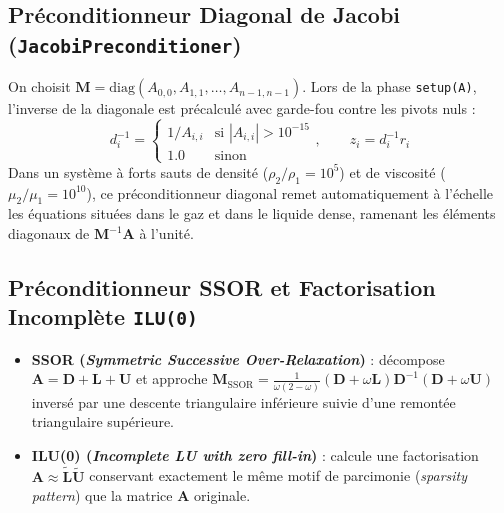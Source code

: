 \documentclass[10pt,a4paper,oneside]{book}
\begin{document}
\subsection{Préconditionneur Diagonal de Jacobi (\texttt{JacobiPreconditioner})}
On choisit $\mathbf{M} = \text{diag}(A_{0,0}, A_{1,1}, \dots, A_{n-1,n-1})$. Lors de la phase \texttt{setup(A)}, l'inverse de la diagonale est précalculé avec garde-fou contre les pivots nuls :
\begin{equation}
  d_i^{-1} = \begin{cases} 1 / A_{i,i} & \text{si } |A_{i,i}| > 10^{-15} \\ 1.0 & \text{sinon} \end{cases}, \qquad z_i = d_i^{-1} r_i
\end{equation}
Dans un système à forts sauts de densité ($\rho_2/\rho_1 = 10^5$) et de viscosité ($\mu_2/\mu_1 = 10^{10}$), ce préconditionneur diagonal remet automatiquement à l'échelle les équations situées dans le gaz et dans le liquide dense, ramenant les éléments diagonaux de $\mathbf{M}^{-1}\mathbf{A}$ à l'unité.

\subsection{Préconditionneur SSOR et Factorisation Incomplète \texttt{ILU(0)}}
\begin{itemize}
  \item \textbf{SSOR (\emph{Symmetric Successive Over-Relaxation})} : décompose $\mathbf{A} = \mathbf{D} + \mathbf{L} + \mathbf{U}$ et approche $\mathbf{M}_{\text{SSOR}} = \frac{1}{\omega(2-\omega)}(\mathbf{D} + \omega\mathbf{L})\mathbf{D}^{-1}(\mathbf{D} + \omega\mathbf{U})$ inversé par une descente triangulaire inférieure suivie d'une remontée triangulaire supérieure.
  \item \textbf{ILU(0) (\emph{Incomplete LU with zero fill-in})} : calcule une factorisation $\mathbf{A} \approx \tilde{\mathbf{L}}\tilde{\mathbf{U}}$ conservant exactement le même motif de parcimonie (\emph{sparsity pattern}) que la matrice $\mathbf{A}$ originale.
\end{itemize}
\end{document}
